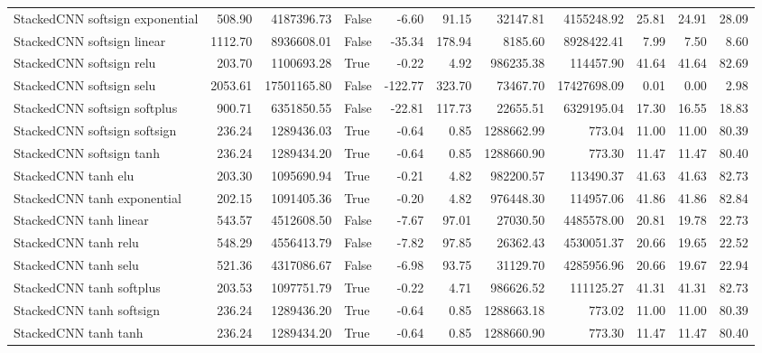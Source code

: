 \begin{tabular}{lrrlrrrrrrr}
StackedCNN softsign exponential & 508.90 & 4187396.73 & False & -6.60 & 91.15 & 32147.81 & 4155248.92 & 25.81 & 24.91 & 28.09 \\
StackedCNN softsign linear & 1112.70 & 8936608.01 & False & -35.34 & 178.94 & 8185.60 & 8928422.41 & 7.99 & 7.50 & 8.60 \\
StackedCNN softsign relu & 203.70 & 1100693.28 & True & -0.22 & 4.92 & 986235.38 & 114457.90 & 41.64 & 41.64 & 82.69 \\
StackedCNN softsign selu & 2053.61 & 17501165.80 & False & -122.77 & 323.70 & 73467.70 & 17427698.09 & 0.01 & 0.00 & 2.98 \\
StackedCNN softsign softplus & 900.71 & 6351850.55 & False & -22.81 & 117.73 & 22655.51 & 6329195.04 & 17.30 & 16.55 & 18.83 \\
StackedCNN softsign softsign & 236.24 & 1289436.03 & True & -0.64 & 0.85 & 1288662.99 & 773.04 & 11.00 & 11.00 & 80.39 \\
StackedCNN softsign tanh & 236.24 & 1289434.20 & True & -0.64 & 0.85 & 1288660.90 & 773.30 & 11.47 & 11.47 & 80.40 \\
StackedCNN tanh elu & 203.30 & 1095690.94 & True & -0.21 & 4.82 & 982200.57 & 113490.37 & 41.63 & 41.63 & 82.73 \\
StackedCNN tanh exponential & 202.15 & 1091405.36 & True & -0.20 & 4.82 & 976448.30 & 114957.06 & 41.86 & 41.86 & 82.84 \\
StackedCNN tanh linear & 543.57 & 4512608.50 & False & -7.67 & 97.01 & 27030.50 & 4485578.00 & 20.81 & 19.78 & 22.73 \\
StackedCNN tanh relu & 548.29 & 4556413.79 & False & -7.82 & 97.85 & 26362.43 & 4530051.37 & 20.66 & 19.65 & 22.52 \\
StackedCNN tanh selu & 521.36 & 4317086.67 & False & -6.98 & 93.75 & 31129.70 & 4285956.96 & 20.66 & 19.67 & 22.94 \\
StackedCNN tanh softplus & 203.53 & 1097751.79 & True & -0.22 & 4.71 & 986626.52 & 111125.27 & 41.31 & 41.31 & 82.73 \\
StackedCNN tanh softsign & 236.24 & 1289436.20 & True & -0.64 & 0.85 & 1288663.18 & 773.02 & 11.00 & 11.00 & 80.39 \\
StackedCNN tanh tanh & 236.24 & 1289434.20 & True & -0.64 & 0.85 & 1288660.90 & 773.30 & 11.47 & 11.47 & 80.40 \\
\bottomrule
\end{tabular}

